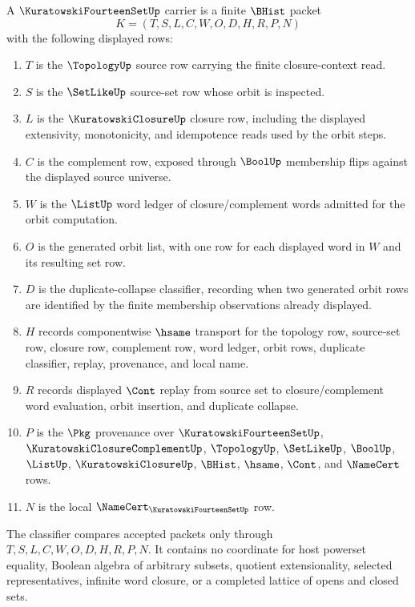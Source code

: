 \begin{definition}
\label{def:kuratowski-fourteen-set-carrier}
A $\KuratowskiFourteenSetUp$ carrier is a finite $\BHist$ packet
$$
K=(T,S,L,C,W,O,D,H,R,P,N)
$$
with the following displayed rows:
\begin{enumerate}
\item $T$ is the $\TopologyUp$ source row carrying the finite closure-context read.
\item $S$ is the $\SetLikeUp$ source-set row whose orbit is inspected.
\item $L$ is the $\KuratowskiClosureUp$ closure row, including the displayed extensivity, monotonicity, and idempotence reads used by the orbit steps.
\item $C$ is the complement row, exposed through $\BoolUp$ membership flips against the displayed source universe.
\item $W$ is the $\ListUp$ word ledger of closure/complement words admitted for the orbit computation.
\item $O$ is the generated orbit list, with one row for each displayed word in $W$ and its resulting set row.
\item $D$ is the duplicate-collapse classifier, recording when two generated orbit rows are identified by the finite membership observations already displayed.
\item $H$ records componentwise $\hsame$ transport for the topology row, source-set row, closure row, complement row, word ledger, orbit rows, duplicate classifier, replay, provenance, and local name.
\item $R$ records displayed $\Cont$ replay from source set to closure/complement word evaluation, orbit insertion, and duplicate collapse.
\item $P$ is the $\Pkg$ provenance over $\KuratowskiFourteenSetUp$, $\KuratowskiClosureComplementUp$, $\TopologyUp$, $\SetLikeUp$, $\BoolUp$, $\ListUp$, $\KuratowskiClosureUp$, $\BHist$, $\hsame$, $\Cont$, and $\NameCert$ rows.
\item $N$ is the local $\NameCert_{\KuratowskiFourteenSetUp}$ row.
\end{enumerate}
The classifier compares accepted packets only through $T,S,L,C,W,O,D,H,R,P,N$. It contains no coordinate for host powerset equality, Boolean algebra of arbitrary subsets, quotient extensionality, selected representatives, infinite word closure, or a completed lattice of opens and closed sets.
\end{definition}

